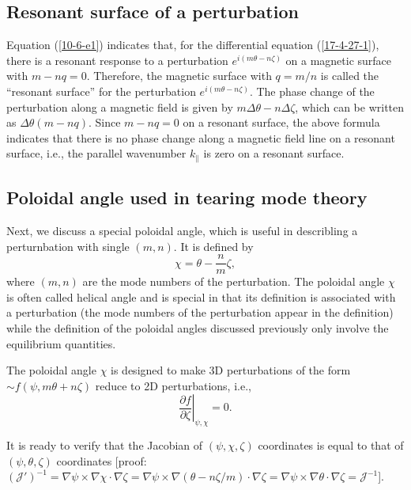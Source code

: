 \documentclass{article}
\begin{document}
\subsection{Resonant surface of a perturbation}

Equation (\ref{10-6-e1}) indicates that, for the differential equation
(\ref{17-4-27-1}), there is a resonant response to a perturbation $e^{i (m
\theta - n \zeta)}$ on a magnetic surface with $m - n q = 0$. Therefore, the
magnetic surface with $q = m / n$ is called the ``resonant surface'' for the
perturbation $e^{i (m \theta - n \zeta)}$. The phase change of the
perturbation along a magnetic field is given by $m \Delta \theta - n \Delta
\zeta$, which can be written as $\Delta \theta (m - n q)$. Since $m - n q = 0$
on a resonant surface, the above formula indicates that there is no phase
change along a magnetic field line on a resonant surface, i.e., the parallel
wavenumber $k_{\parallel}$ is zero on a resonant surface.

\subsection{Poloidal angle used in tearing mode theory}

Next, we discuss a special poloidal angle, which is useful in describling a
perturnbation with single $(m, n)$. It is defined by
\begin{equation}
  \chi = \theta - \frac{n}{m} \zeta,
\end{equation}
where $(m, n)$ are the mode numbers of the perturbation. The poloidal angle
$\chi$ is often called helical angle and is special in that its definition is
associated with a perturbation (the mode numbers of the perturbation appear in
the definition) while the definition of the poloidal angles discussed
previously only involve the equilibrium quantities.

The poloidal angle $\chi$ is designed to make 3D perturbations of the form
$\sim f (\psi, m \theta + n \zeta)$ reduce to 2D perturbations, i.e.,
\begin{equation}
  \left. \frac{\partial f}{\partial \zeta} \right|_{\psi, \chi} = 0.
\end{equation}


It is ready to verify that the Jacobian of $(\psi, \chi, \zeta)$ coordinates
is equal to that of $(\psi, \theta, \zeta)$ coordinates [proof:
$(\mathcal{J}')^{- 1} = \nabla \psi \times \nabla \chi \cdot \nabla \zeta =
\nabla \psi \times \nabla (\theta - n \zeta / m) \cdot \nabla \zeta = \nabla
\psi \times \nabla \theta \cdot \nabla \zeta =\mathcal{J}^{- 1}$].
\end{document}
